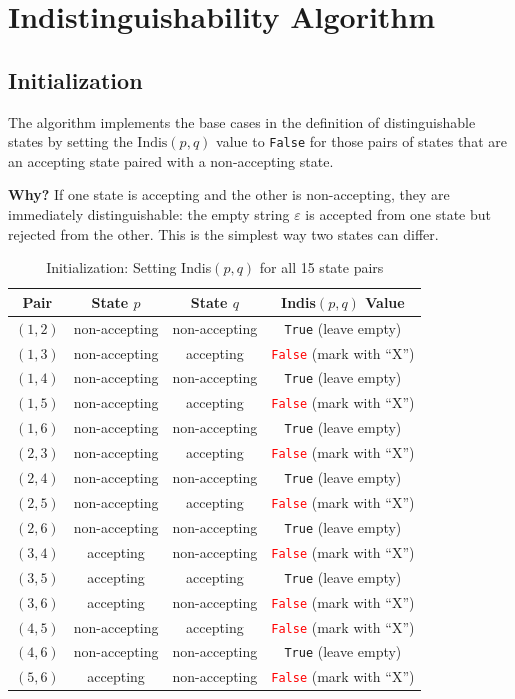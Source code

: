 \documentclass{article}
\begin{document}
\section{Indistinguishability Algorithm}
\subsection*{Initialization}

The algorithm implements the base cases in the definition of distinguishable states by setting the $\text{Indis}(p, q)$ value to \texttt{False} for those pairs of states that are an accepting state paired with a non-accepting state.

\textbf{Why?} If one state is accepting and the other is non-accepting, they are immediately distinguishable: the empty string $\varepsilon$ is accepted from one state but rejected from the other. This is the simplest way two states can differ.
\begin{table}[h!]
\centering
\small
\begin{tabular}{c c c c}
\toprule
\textbf{Pair} & \textbf{State $p$} & \textbf{State $q$} & \textbf{Indis$(p,q)$ Value} \\
\midrule
$(1, 2)$ & 
non-accepting & 
non-accepting &\texttt{True} (leave empty) \\
$(1, 3)$ & 
non-accepting & 
accepting &\textcolor{red}{\texttt{False}} (mark with ``X'') \\
$(1, 4)$ & 
non-accepting & 
non-accepting &\texttt{True} (leave empty) \\
$(1, 5)$ & 
non-accepting & 
accepting &\textcolor{red}{\texttt{False}} (mark with ``X'') \\
$(1, 6)$ & 
non-accepting & 
non-accepting &\texttt{True} (leave empty) \\
$(2, 3)$ & 
non-accepting & 
accepting &\textcolor{red}{\texttt{False}} (mark with ``X'') \\
$(2, 4)$ & 
non-accepting & 
non-accepting &\texttt{True} (leave empty) \\
$(2, 5)$ & 
non-accepting & 
accepting &\textcolor{red}{\texttt{False}} (mark with ``X'') \\
$(2, 6)$ & 
non-accepting & 
non-accepting &\texttt{True} (leave empty) \\
$(3, 4)$ & 
accepting & 
non-accepting &\textcolor{red}{\texttt{False}} (mark with ``X'') \\
$(3, 5)$ & 
accepting & 
accepting &\texttt{True} (leave empty) \\
$(3, 6)$ & 
accepting & 
non-accepting &\textcolor{red}{\texttt{False}} (mark with ``X'') \\
$(4, 5)$ & 
non-accepting & 
accepting &\textcolor{red}{\texttt{False}} (mark with ``X'') \\
$(4, 6)$ & 
non-accepting & 
non-accepting &\texttt{True} (leave empty) \\
$(5, 6)$ & 
accepting & 
non-accepting &\textcolor{red}{\texttt{False}} (mark with ``X'') \\
\bottomrule
\end{tabular}
\caption{Initialization: Setting Indis$(p,q)$ for all 15 state pairs}
\end{table}
\end{document}
